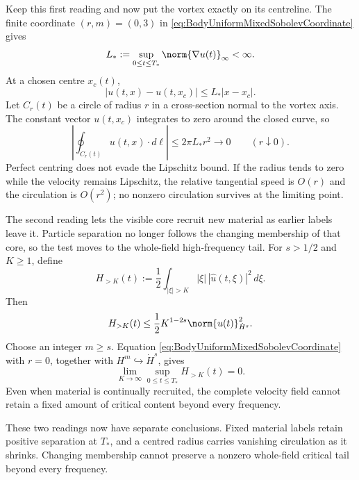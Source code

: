 Keep this first reading and now put the vortex exactly on its centreline.
The finite coordinate \((r,m)=(0,3)\) in \eqref{eq:BodyUniformMixedSobolevCoordinate} gives
\begin{equation}\label{eq:BodyUniformLipschitzBound}
  L_*:=\sup_{0\leq t\leq T_*}\norm{\nabla u(t)}_\infty<\infty.
\end{equation}
At a chosen centre \(x_c(t)\),
\[
  |u(t,x)-u(t,x_c)|\leq L_*|x-x_c|.
\]
Let \(C_r(t)\) be a circle of radius \(r\) in a cross-section normal to the vortex axis.
The constant vector \(u(t,x_c)\) integrates to zero around the closed curve, so
\begin{equation}\label{eq:BodyCenteredCirculationBound}
  \left|
    \oint_{C_r(t)}u(t,x)\cdot d\ell
  \right|
  \leq2\pi L_*r^2
  \longrightarrow0
  \qquad(r\downarrow0).
\end{equation}
Perfect centring does not evade the Lipschitz bound.  If the radius tends to zero while
the velocity remains Lipschitz, the relative tangential speed is \(O(r)\) and the
circulation is \(O(r^2)\); no nonzero circulation survives at the limiting point.

The second reading lets the visible core recruit new material as earlier labels leave
it.
Particle separation no longer follows the changing membership of that core, so the test moves to the whole-field high-frequency tail.
For \(s>1/2\) and \(K\geq1\), define
\[
  H_{>K}(t)
  :=\frac12\int_{|\xi|>K}
  |\xi|\,|\widehat u(t,\xi)|^2\,d\xi.
\]
Then
\begin{equation}\label{eq:BodyUltravioletCriticalTail}
  H_{>K}(t)
  \leq
  \frac12K^{1-2s}\norm{u(t)}_{\dot H^s}^2.
\end{equation}
Choose an integer \(m\geq s\).
Equation \eqref{eq:BodyUniformMixedSobolevCoordinate} with \(r=0\), together with
\(H^m\hookrightarrow\dot H^s\), gives
\begin{equation}\label{eq:BodyUniformUltravioletVanishing}
  \lim_{K\to\infty}
  \sup_{0\leq t\leq T_*}H_{>K}(t)=0.
\end{equation}
Even when material is continually recruited, the complete velocity field cannot retain a fixed amount of critical content beyond every frequency.

These two readings now have separate conclusions.
Fixed material labels retain positive separation at \(T_*\), and a centred radius carries vanishing circulation as it shrinks.
Changing membership cannot preserve a nonzero whole-field critical tail beyond every frequency.

